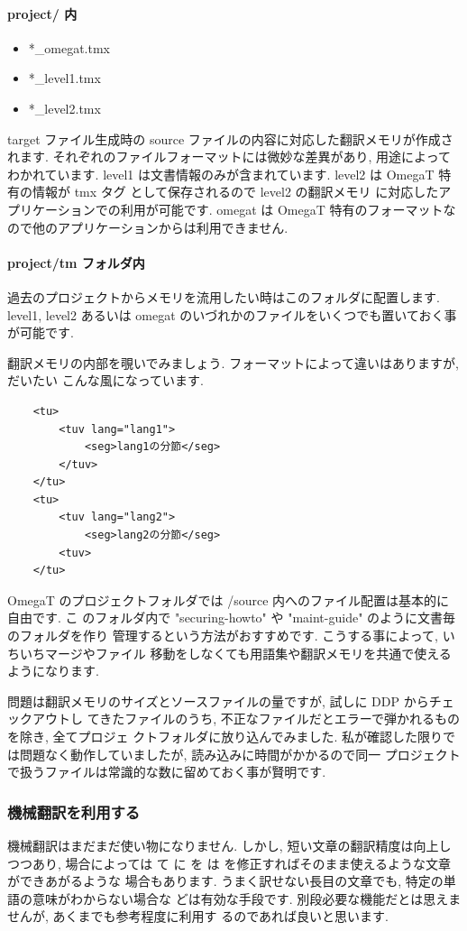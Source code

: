 \documentclass[mingoth,a4paper]{jsarticle}
\begin{document}
\paragraph{project/ 内}
\begin{itemize}
	\item{*\_omegat.tmx}
	\item{*\_level1.tmx}
	\item{*\_level2.tmx}
\end{itemize}
target ファイル生成時の source ファイルの内容に対応した翻訳メモリが作成されます.
それぞれのファイルフォーマットには微妙な差異があり, 用途によってわかれています.
level1 は文書情報のみが含まれています.
level2 は OmegaT 特有の情報が tmx タグ として保存されるので level2 の翻訳メモリ
に対応したアプリケーションでの利用が可能です.
omegat は OmegaT 特有のフォーマットなので他のアプリケーションからは利用できません.

\paragraph{project/tm フォルダ内}
過去のプロジェクトからメモリを流用したい時はこのフォルダに配置します. level1, level2
あるいは omegat のいづれかのファイルをいくつでも置いておく事が可能です.

翻訳メモリの内部を覗いでみましょう. フォーマットによって違いはありますが, だいたい
こんな風になっています.
\begin{verbatim}
	<tu>
		<tuv lang="lang1">
			<seg>lang1の分節</seg>
		</tuv>
	</tu>
	<tu>
		<tuv lang="lang2">
			<seg>lang2の分節</seg>
		<tuv>
	</tu>
\end{verbatim}

OmegaT のプロジェクトフォルダでは /source 内へのファイル配置は基本的に自由です. こ
のフォルダ内で "securing-howto" や "maint-guide" のように文書毎のフォルダを作り
管理するという方法がおすすめです. こうする事によって, いちいちマージやファイル
移動をしなくても用語集や翻訳メモリを共通で使えるようになります.

問題は翻訳メモリのサイズとソースファイルの量ですが, 試しに DDP からチェックアウトし
てきたファイルのうち, 不正なファイルだとエラーで弾かれるものを除き, 全てプロジェ
クトフォルダに放り込んでみました.
私が確認した限りでは問題なく動作していましたが, 読み込みに時間がかかるので同一
プロジェクトで扱うファイルは常識的な数に留めておく事が賢明です.

\subsubsection{機械翻訳を利用する}
機械翻訳はまだまだ使い物になりません. しかし, 短い文章の翻訳精度は向上しつつあり,
場合によっては て に を は を修正すればそのまま使えるような文章ができあがるような
場合もあります. うまく訳せない長目の文章でも, 特定の単語の意味がわからない場合な
どは有効な手段です. 別段必要な機能だとは思えませんが, あくまでも参考程度に利用す
るのであれば良いと思います.
\end{document}
